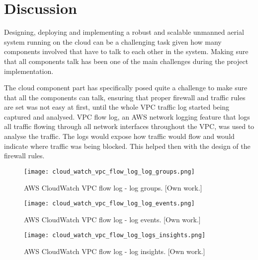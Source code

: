 
\chapter{Discussion}
\label{chap:discussion}

Designing, deploying and implementing a robust and scalable unmanned aerial system running on the cloud can be a challenging task given how many components involved that have to talk to each other in the system. Making sure that all components talk has been one of the main challenges during the project implementation.

The cloud component part has specifically posed quite a challenge to make sure that all the components can talk, ensuring that proper firewall and traffic rules are set was not easy at first, until the whole VPC traffic log started being captured and analysed. VPC flow log, an AWS network logging feature that logs all traffic flowing through all network interfaces throughout the VPC, was used to analyse the traffic. The logs would expose how traffic would flow and would indicate where traffic was being blocked. This helped then with the design of the firewall rules.

\begin{figure}[H]
    \centering \texttt{[image: cloud\_watch\_vpc\_flow\_log\_log\_groups.png]}
    \caption{AWS CloudWatch VPC flow log - log groups. [Own work.]}
    \label{fig:cloud-watch-vpc-flow-log-log-groups}
\end{figure}

\begin{figure}[H]
    \centering \texttt{[image: cloud\_watch\_vpc\_flow\_log\_log\_events.png]}
    \caption{AWS CloudWatch VPC flow log - log events. [Own work.]}
    \label{fig:cloud-watch-vpc-flow-log-log-events}
\end{figure}

\begin{figure}[H]
    \centering \texttt{[image: cloud\_watch\_vpc\_flow\_log\_logs\_insights.png]}
    \caption{AWS CloudWatch VPC flow log - log insights. [Own work.]}
    \label{fig:cloud-watch-vpc-flow-log-log-insights}
\end{figure}

